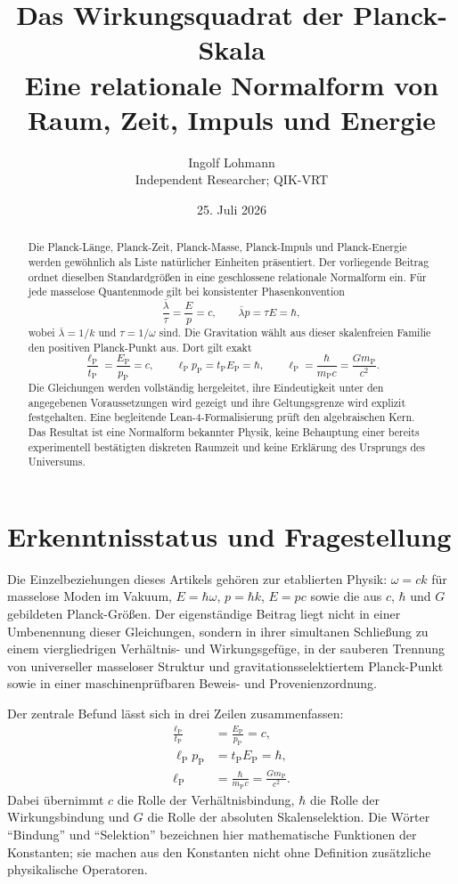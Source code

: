\documentclass[11pt,a4paper]{article}
\title{\textbf{Das Wirkungsquadrat der Planck-Skala}\\[0.5em]
\large Eine relationale Normalform von Raum, Zeit, Impuls und Energie}
\author{Ingolf Lohmann\\Independent Researcher; QIK-VRT}
\date{25. Juli 2026}
\newcommand{\lP}{\ell_{\mathrm P}}
\newcommand{\tP}{t_{\mathrm P}}
\newcommand{\mP}{m_{\mathrm P}}
\newcommand{\pP}{p_{\mathrm P}}
\newcommand{\EP}{E_{\mathrm P}}
\begin{document}
\maketitle

\begin{abstract}
Die Planck-Länge, Planck-Zeit, Planck-Masse, Planck-Impuls und
Planck-Energie werden gewöhnlich als Liste natürlicher Einheiten präsentiert.
Der vorliegende Beitrag ordnet dieselben Standardgrößen in eine geschlossene
relationale Normalform ein. Für jede masselose Quantenmode gilt bei konsistenter
Phasenkonvention
\[
  \frac{\bar\lambda}{\tau}=\frac{E}{p}=c,
  \qquad
  \bar\lambda p=\tau E=\hbar,
\]
wobei $\bar\lambda=1/k$ und $\tau=1/\omega$ sind. Die Gravitation wählt aus
dieser skalenfreien Familie den positiven Planck-Punkt aus. Dort gilt exakt
\[
  \frac{\lP}{\tP}=\frac{\EP}{\pP}=c,
  \qquad
  \lP\pP=\tP\EP=\hbar,
  \qquad
  \lP=\frac{\hbar}{\mP c}=\frac{G\mP}{c^2}.
\]
Die Gleichungen werden vollständig hergeleitet, ihre Eindeutigkeit unter den
angegebenen Voraussetzungen wird gezeigt und ihre Geltungsgrenze wird
explizit festgehalten. Eine begleitende Lean-4-Formalisierung prüft den
algebraischen Kern. Das Resultat ist eine Normalform bekannter Physik, keine
Behauptung einer bereits experimentell bestätigten diskreten Raumzeit und
keine Erklärung des Ursprungs des Universums.
\end{abstract}

\section{Erkenntnisstatus und Fragestellung}

Die Einzelbeziehungen dieses Artikels gehören zur etablierten Physik:
$\omega=ck$ für masselose Moden im Vakuum, $E=\hbar\omega$,
$p=\hbar k$, $E=pc$ sowie die aus $c$, $\hbar$ und $G$ gebildeten
Planck-Größen. Der eigenständige Beitrag liegt nicht in einer Umbenennung
dieser Gleichungen, sondern in ihrer simultanen Schließung zu einem
viergliedrigen Verhältnis- und Wirkungsgefüge, in der sauberen Trennung von
universeller masseloser Struktur und gravitationsselektiertem Planck-Punkt
sowie in einer maschinenprüfbaren Beweis- und Provenienzordnung.

Der zentrale Befund lässt sich in drei Zeilen zusammenfassen:
\begin{align}
 \frac{\lP}{\tP}&=\frac{\EP}{\pP}=c, \label{eq:ratio}\\
 \lP\pP&=\tP\EP=\hbar, \label{eq:products}\\
 \lP&=\frac{\hbar}{\mP c}=\frac{G\mP}{c^2}. \label{eq:anchor}
\end{align}
Dabei übernimmt $c$ die Rolle der Verhältnisbindung, $\hbar$ die Rolle der
Wirkungsbindung und $G$ die Rolle der absoluten Skalenselektion. Die Wörter
``Bindung'' und ``Selektion'' bezeichnen hier mathematische Funktionen der
Konstanten; sie machen aus den Konstanten nicht ohne Definition zusätzliche
physikalische Operatoren.
\end{document}
